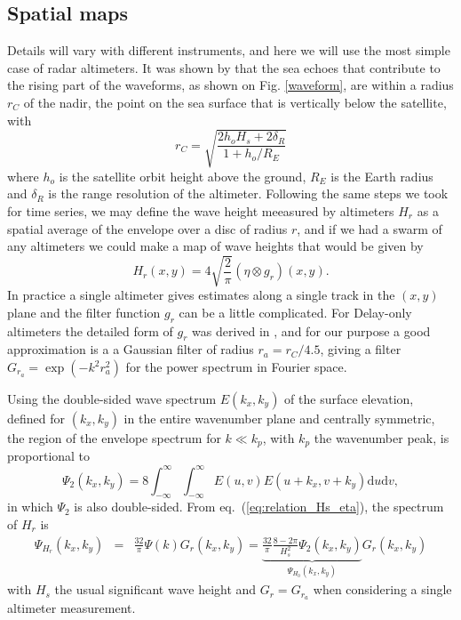 {\subsection{Spatial maps}
Details will vary with different instruments, and here we will use the most simple case of radar altimeters. It was shown by \cite{Chelton&al.1989} that the sea echoes that contribute to the rising part of the waveforms, as shown on Fig. \ref{waveform}, are within a radius $r_C$ of the nadir, the point on the sea surface that is vertically below the satellite, with 
\begin{equation}
    r_C =\sqrt{\frac{ 2 h_o H_s+ 2 \delta_R}{1+h_o/R_E}} \label{eq:rC}
\end{equation}
where $h_o$ is the satellite orbit height above the ground, $R_E$ is the Earth radius and $\delta_R$ is the range resolution of the altimeter.  Following the same steps we took for time series, we may define the wave height meeasured by altimeters $H_{r}$ as a spatial average of the envelope over a disc of radius $r$, and if we had a swarm of any altimeters we could make a map of wave heights that would be given by 
\begin{equation}
    H_{r}(x,y) = 4\sqrt{\frac{2}{\pi}} (\eta \otimes g_{r})(x,y).
   \label{eq:relation_Hs_eta}
\end{equation}
In practice a single altimeter gives estimates along a single track in the $(x,y)$ plane and the filter function $g_r$ can be a little complicated. For Delay-only altimeters the detailed form of $g_r$ was derived in \cite{DeCarlo&al.2023}, and for our purpose a good approximation is a a Gaussian filter of radius $r_a=r_C/4.5$, giving a filter $G_{r_a}=\exp{(-k^2 r_a^2)}$ for the power spectrum in Fourier space.  

Using the double-sided wave spectrum $E(k_x,k_y)$ of the surface elevation, defined for $(k_x,k_y)$ in the entire wavenumber plane and centrally symmetric, the region of the envelope spectrum for $k \ll k_p$, with $k_p$ the wavenumber peak, is 
proportional to
\begin{equation}
    \Psi_{2}(k_x,k_y) = 8 \int_{-\infty}^\infty 
    \int_{-\infty}^\infty
E(u,v)E(u+k_x,v+k_y)\mathrm{d}u \mathrm{d}v,
\end{equation}
in which $\Psi_{2}$ is also double-sided. From  eq.~(\ref{eq:relation_Hs_eta}), the spectrum of $H_r$ is
\begin{eqnarray}
\Psi_{H_r}(k_x,k_y) &= & \frac{32}{\pi}  \Psi(k)  G_{r}(k_x,k_y) =  \underbrace{\frac{32}{\pi} \frac{8 - 2\pi}{H_s^2}   \Psi_2(k_x,k_y)}_{\Psi_{H_0}(k_x,k_y)}  G_{r}(k_x,k_y)\label{eq:eq2_inFourier}
\end{eqnarray}
with $H_s$ the usual significant wave height and $G_{r}=G_{r_a}$ when considering a single altimeter measurement.

}
